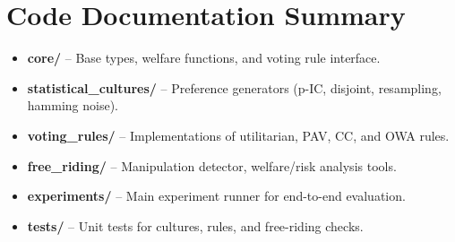 \documentclass[11pt]{article}
\begin{document}
\section{Code Documentation Summary}
\begin{itemize}
  \item \textbf{core/} – Base types, welfare functions, and voting rule interface.
  \item \textbf{statistical\_cultures/} – Preference generators (p-IC, disjoint, resampling, hamming noise).
  \item \textbf{voting\_rules/} – Implementations of utilitarian, PAV, CC, and OWA rules.
  \item \textbf{free\_riding/} – Manipulation detector, welfare/risk analysis tools.
  \item \textbf{experiments/} – Main experiment runner for end-to-end evaluation.
  \item \textbf{tests/} – Unit tests for cultures, rules, and free-riding checks.
\end{itemize}



\end{document}
